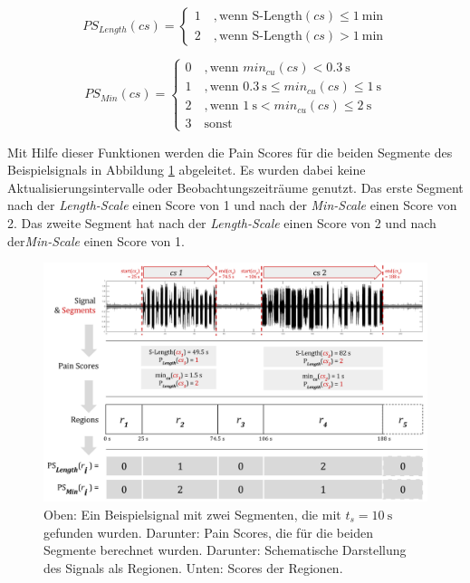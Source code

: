 \begin{equation}
PS_{Length}(cs) = \begin{cases}
 1 \quad ,  \text{wenn } \text{S-Length}(cs) \leq \SI{1}{\minute} \\
 2 \quad ,  \text{wenn } \text{S-Length}(cs) > \SI{1}{\minute}
 \end{cases}	
 \label{eq:ps_length}
\end{equation}

\begin{equation}
PS_{Min}(cs) = \begin{cases}
 0 \quad ,  \text{wenn } min_{cu}(cs) < \SI{0.3}{\second}\\
 1 \quad ,  \text{wenn } \SI{0.3}{\second} \leq min_{cu}(cs) \leq \SI{1}{\second}\\
 2 \quad ,  \text{wenn } \SI{1}{\second} < min_{cu}(cs) \leq \SI{2}{\second} \\
 3 \quad  \text{sonst }
 \end{cases}	
 \label{eq:ps_length}
\end{equation}

Mit Hilfe dieser Funktionen werden die Pain Scores für die beiden Segmente des Beispielsignals in Abbildung \ref{img:visualisation_example_01} abgeleitet. Es wurden dabei keine Aktualisierungsintervalle oder Beobachtungszeiträume genutzt. Das erste Segment nach der \emph{Length-Scale} einen Score von 1 und nach der \emph{Min-Scale} einen Score von 2. Das zweite Segment hat nach der \emph{Length-Scale} einen Score von 2 und nach der\emph{Min-Scale} einen Score von 1.

\begin{figure}[h]
	\centering
	\includegraphics[width=1\textwidth]{bilder/visualisation_example_01.png}
	\caption{Oben: Ein Beispielsignal mit zwei Segmenten, die mit $t_s = \SI{10}{\second}$ gefunden wurden. Darunter: Pain Scores, die für die beiden Segmente berechnet wurden. Darunter: Schematische Darstellung des Signals als Regionen. Unten: Scores der Regionen.}
	\label{img:visualisation_example_01}
\end{figure}

